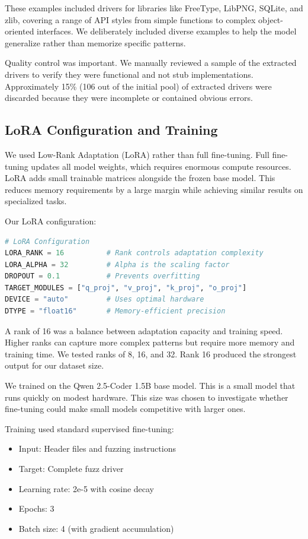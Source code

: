 These examples included drivers for libraries like FreeType, LibPNG, SQLite, and zlib, covering a range of API styles from simple functions to complex object-oriented interfaces. We deliberately included diverse examples to help the model generalize rather than memorize specific patterns.

Quality control was important. We manually reviewed a sample of the extracted drivers to verify they were functional and not stub implementations. Approximately 15\% (106 out of the initial pool) of extracted drivers were discarded because they were incomplete or contained obvious errors.

\subsection{LoRA Configuration and Training}

We used Low-Rank Adaptation (LoRA) \cite{Hu2021} rather than full fine-tuning. Full fine-tuning updates all model weights, which requires enormous compute resources. LoRA adds small trainable matrices alongside the frozen base model. This reduces memory requirements by a large margin while achieving similar results on specialized tasks.

Our LoRA configuration:

\begin{lstlisting}[language=Python, caption={LoRA Configuration Parameters}]
# LoRA Configuration
LORA_RANK = 16          # Rank controls adaptation complexity
LORA_ALPHA = 32         # Alpha is the scaling factor
DROPOUT = 0.1           # Prevents overfitting
TARGET_MODULES = ["q_proj", "v_proj", "k_proj", "o_proj"]
DEVICE = "auto"         # Uses optimal hardware
DTYPE = "float16"       # Memory-efficient precision
\end{lstlisting}

A rank of 16 was a balance between adaptation capacity and training speed. Higher ranks can capture more complex patterns but require more memory and training time. We tested ranks of 8, 16, and 32. Rank 16 produced the strongest output for our dataset size.

We trained on the Qwen 2.5-Coder 1.5B base model. This is a small model that runs quickly on modest hardware. This size was chosen to investigate whether fine-tuning could make small models competitive with larger ones.

Training used standard supervised fine-tuning:
\begin{itemize}
    \item Input: Header files and fuzzing instructions
    \item Target: Complete fuzz driver
    \item Learning rate: 2e-5 with cosine decay
    \item Epochs: 3
    \item Batch size: 4 (with gradient accumulation)
\end{itemize}

